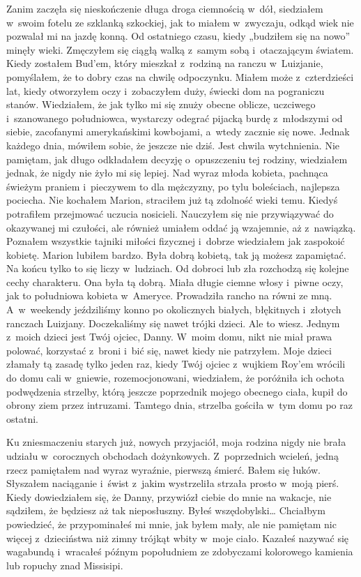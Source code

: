 Zanim zaczęła się nieskończenie długa droga ciemnością w~dół, siedziałem w~swoim fotelu ze szklanką szkockiej, jak to miałem w~zwyczaju, odkąd wiek nie pozwalał mi na jazdę konną. Od ostatniego czasu, kiedy „budziłem się na nowo” minęły wieki. Zmęczyłem się ciągłą walką z~samym sobą i~otaczającym światem. Kiedy zostałem Bud’em, który mieszkał z~rodziną na ranczu w~Luizjanie, pomyślałem, że to dobry czas na chwilę odpoczynku. Miałem może z~czterdzieści lat, kiedy otworzyłem oczy i~zobaczyłem duży, świecki dom na pograniczu stanów. Wiedziałem, że jak tylko mi się znuży obecne oblicze, uczciwego i~szanowanego południowca, wystarczy odegrać pijacką burdę z~młodszymi od siebie, zacofanymi amerykańskimi kowbojami, a~wtedy zacznie się nowe. Jednak każdego dnia, mówiłem sobie, że jeszcze nie dziś. Jest chwila wytchnienia. Nie pamiętam, jak długo odkładałem decyzję o~opuszczeniu tej rodziny, wiedziałem jednak, że nigdy nie żyło mi się lepiej. Nad wyraz młoda kobieta, pachnąca świeżym praniem i~pieczywem to dla mężczyzny, po tylu boleściach, najlepsza pociecha. Nie kochałem Marion, straciłem już tą zdolność wieki temu. Kiedyś potrafiłem przejmować uczucia nosicieli. Nauczyłem się nie przywiązywać do okazywanej mi czułości, ale również umiałem oddać ją wzajemnie, aż z~nawiązką. Poznałem wszystkie tajniki miłości fizycznej i~dobrze wiedziałem jak zaspokoić kobietę. Marion lubiłem bardzo. Była dobrą kobietą, tak ją możesz zapamiętać. Na końcu tylko to się liczy w~ludziach. Od dobroci lub zła rozchodzą się kolejne cechy charakteru. Ona była tą dobrą. Miała długie ciemne włosy i~piwne oczy, jak to południowa kobieta w~Ameryce. Prowadziła rancho na równi ze mną. A~w~weekendy jeździliśmy konno po okolicznych białych, błękitnych i~złotych ranczach Luizjany. Doczekaliśmy się nawet trójki dzieci. Ale to wiesz. Jednym z~moich dzieci jest Twój ojciec, Danny. W~moim domu, nikt nie miał prawa polować, korzystać z~broni i~bić się, nawet kiedy nie patrzyłem. Moje dzieci złamały tą zasadę tylko jeden raz, kiedy Twój ojciec z~wujkiem Roy’em wrócili do domu cali w~gniewie, rozemocjonowani, wiedziałem, że poróżniła ich ochota podwędzenia strzelby, którą jeszcze poprzednik mojego obecnego ciała, kupił do obrony ziem przez intruzami. Tamtego dnia, strzelba gościła w~tym domu po raz ostatni.

Ku zniesmaczeniu starych już, nowych przyjaciół, moja rodzina nigdy nie brała udziału w~corocznych obchodach dożynkowych. Z~poprzednich wcieleń, jedną rzecz pamiętałem nad wyraz wyraźnie, pierwszą śmierć. Bałem się łuków. Słyszałem naciąganie i~świst z~jakim wystrzeliła strzała prosto w~moją pierś. Kiedy dowiedziałem się, że Danny, przywiózł ciebie do mnie na wakacje, nie sądziłem, że będziesz aż tak nieposłuszny. Byłeś wszędobylski… Chciałbym powiedzieć, że przypominałeś mi mnie, jak byłem mały, ale nie pamiętam nic więcej z~dzieciństwa niż zimny trójkąt wbity w~moje ciało. Kazałeś nazywać się wagabundą i~wracałeś późnym popołudniem ze zdobyczami kolorowego kamienia lub ropuchy znad Missisipi.

